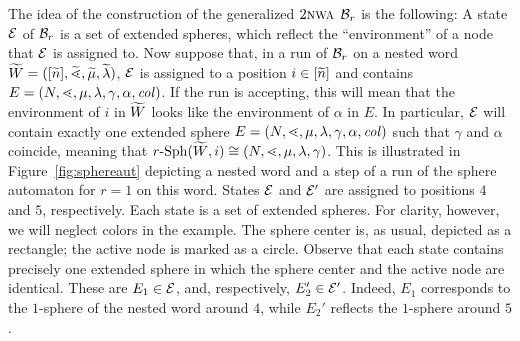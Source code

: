 \documentclass{LMCS}
\begin{document}
The idea of the construction of the generalized $2\textsc{nwa}$ $\mathcal{B}_r$ is the
following: A state $\mathcal{E}$ of $\mathcal{B}_r$ is a set of extended spheres,
which reflect the ``environment'' of a node that $\mathcal{E}$ is assigned to. Now
suppose that, in a run of $\mathcal{B}_r$ on a nested word ${\widetilde{W}} =
([\widetilde{n}],\widetilde{\mathord{\lessdot}},\widetilde{\mu},\widetilde{\lambda})$, $\mathcal{E}$ is assigned to a position $i \in
[\widetilde{n}]$ and contains $E=(N,\mathord{\lessdot},\mu,\lambda,\gamma,\alpha,\mathit{col})$. If the
run is accepting, this will mean that the environment of $i$ in ${\widetilde{W}}$ looks
like the environment of $\alpha$ in $E$. In particular, $\mathcal{E}$ will contain
exactly one extended sphere $E=(N,\mathord{\lessdot},\mu,\lambda,\gamma,\alpha,\mathit{col})$
such that $\gamma$ and $\alpha$ coincide, meaning that $r\text{-}\mathrm{Sph}({\widetilde{W}},i)
\cong (N,\mathord{\lessdot},\mu,\lambda,\gamma)$. This is illustrated in
Figure~\ref{fig:sphereaut} depicting a nested word and a step of a run of the
sphere automaton for $r = 1$ on this word. States $\mathcal{E}$ and $\mathcal{E}'$ are
assigned to positions $4$ and $5$, respectively. Each state is a set of
extended spheres. For clarity, however, we will neglect colors in the example.
The sphere center is, as usual, depicted as a rectangle; the active node is
marked as a circle. Observe that each state contains precisely one extended
sphere in which the sphere center and the active node are identical. These are
$E_1 \in \mathcal{E}$, and, respectively, $E_2' \in \mathcal{E}'$. Indeed, $E_1$
corresponds to the $1$-sphere of the nested word around $4$, while $E_2'$
reflects the $1$-sphere around $5$.
\end{document}
